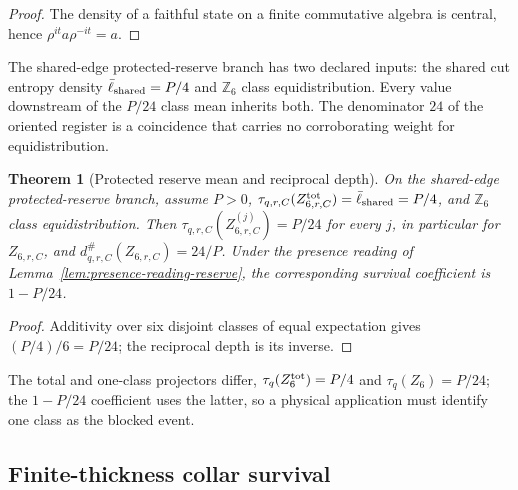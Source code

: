 \documentclass[11pt]{article}
\newtheorem{theorem}{Theorem}[section]
\theoremstyle{remark}
\theoremstyle{plain}
\begin{document}
\begin{proof}
The density of a faithful state on a finite commutative algebra is central,
hence \(\rho^{it}a\rho^{-it}=a\).
\end{proof}

The shared-edge protected-reserve branch has two declared inputs: the shared
cut entropy density \(\bar\ell_{\rm shared}=P/4\) and \(\mathbb Z_6\) class
equidistribution. Every value downstream of the \(P/24\) class mean inherits
both. The denominator \(24\) of the oriented register is a coincidence that
carries no corroborating weight for equidistribution.

\begin{theorem}[Protected reserve mean and reciprocal depth]
\label{thm:z6-reserve-trace}
On the shared-edge protected-reserve branch, assume \(P>0\),
\(\tau_{q,r,C}(Z^{\rm tot}_{6,r,C})=\bar\ell_{\rm shared}=P/4\), and
\(\mathbb Z_6\) class equidistribution. Then
\(\tau_{q,r,C}(Z^{(j)}_{6,r,C})=P/24\) for every \(j\), in particular for
\(Z_{6,r,C}\), and \(d^{\#}_{q,r,C}(Z_{6,r,C})=24/P\). Under the presence reading of Lemma~\ref{lem:presence-reading-reserve},
the corresponding survival coefficient is \(1-P/24\).
\end{theorem}

\begin{proof}
Additivity over six disjoint classes of equal expectation gives
\((P/4)/6=P/24\); the reciprocal depth is its inverse.
\end{proof}

The total and one-class projectors differ, \(\tau_q(Z^{\rm tot}_6)=P/4\) and
\(\tau_q(Z_6)=P/24\); the \(1-P/24\) coefficient uses the latter, so a
physical application must identify one class as the blocked event.

\subsection{Finite-thickness collar survival}
\end{document}
